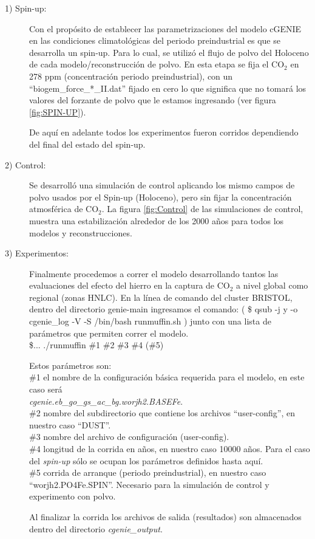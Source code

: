 \begin{description}
\item[1) Spin-up:] Con el propósito de establecer las parametrizaciones del modelo cGENIE en las condiciones climatológicas del periodo preindustrial es que se desarrolla un spin-up. Para lo cual, se utilizó el flujo de polvo del Holoceno de cada modelo/reconstrucción de polvo. En esta etapa se fija el CO$_2$ en 278 ppm (concentración periodo preindustrial), con un ``biogem\_force\_*\_II.dat'' fijado en cero lo que significa que no tomará los valores del forzante de polvo que le estamos ingresando (ver figura \ref{fig:SPIN-UP}). 

De aquí en adelante todos los experimentos fueron corridos dependiendo del final del estado del spin-up. 

\item[2) Control:] Se desarroll\'o una simulación de control aplicando los mismo campos de polvo usados por el Spin-up (Holoceno), pero sin fijar la concentración atmosférica de CO$_2$. La figura \ref{fig:Control} de las simulaciones de control, muestra una estabilización alrededor de los 2000 años para todos los modelos y reconstrucciones.

\item[3) Experimentos:] Finalmente procedemos a correr el modelo desarrollando tantos las evaluaciones del efecto del hierro en la captura de CO$_2$ a nivel global como regional (zonas HNLC).
En la l\'inea de comando del cluster BRISTOL, dentro del directorio genie-main ingresamos el comando: ( \$ qsub -j y -o cgenie\_log -V -S /bin/bash runmuffin.sh ) junto con una lista de parámetros que permiten correr el modelo.\\
\$... ./runmuffin \#1 \#2 \#3 \#4 (\#5)

Estos par\'ametros son:\\
\#1 el nombre de la configuraci\'on b\'asica requerida para el modelo, en este caso ser\'a\\
\textit{cgenie.eb\_go\_gs\_ac\_bg.worjh2.BASEFe}.\\
\#2 nombre del subdirectorio que contiene los archivos ``user-config'', en nuestro caso ``DUST''. \\
\#3 nombre del archivo de configuraci\'on (user-config).\\
\#4 longitud de la corrida en a\~nos, en nuestro caso 10000 a\~nos. Para el caso del \textit{spin-up} s\'olo se ocupan los par\'ametros definidos hasta aqu\'i.  \\ 
\#5 corrida de arranque (periodo preindustrial), en nuestro caso ``worjh2.PO4Fe.SPIN''. Necesario para la simulaci\'on de control y experimento con polvo. 

Al finalizar la corrida los archivos de salida (resultados) son almacenados dentro del directorio \textit{cgenie\_output}. 
\end{description}


